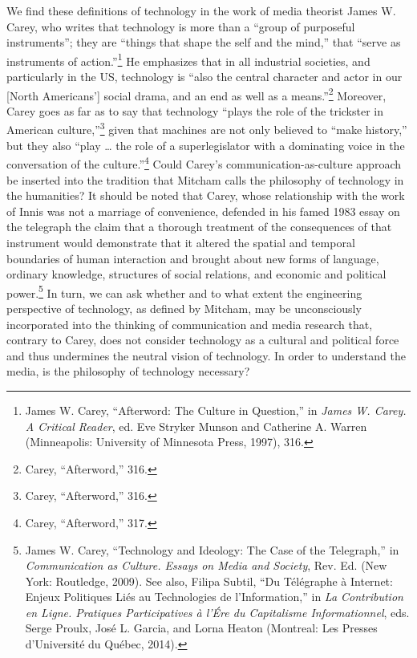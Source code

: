 \documentclass{tufte-handout}
\begin{document}
We find these definitions of technology in the work of media theorist
James W. Carey, who writes that technology is more than a ``group of
purposeful instruments''; they are ``things that shape the self and the
mind,'' that ``serve as instruments of
action.''\footnote{James W. Carey, ``Afterword: The Culture in Question,'' in \emph{James
  W. Carey. A Critical Reader}, ed. Eve Stryker Munson and Catherine A.
  Warren (Minneapolis: University of Minnesota Press, 1997), 316.
} He emphasizes that in
all industrial societies, and particularly in the US, technology is
``also the central character and actor in our {[}North Americans'{]}
social drama, and an end as well as a
means.''\footnote{Carey, ``Afterword,'' 316.
} Moreover, Carey goes as
far as to say that technology ``plays the role of the trickster in
American culture,''\footnote{Carey, ``Afterword,'' 316.
} given that
machines are not only believed to ``make history,'' but they also ``play
\ldots{} the role of a superlegislator with a dominating voice in the
conversation of the culture.''\footnote{Carey, ``Afterword,'' 317.
}
Could Carey's communication-as-culture approach be inserted into the
tradition that Mitcham calls the philosophy of technology in the
humanities? It should be noted that Carey, whose relationship with the
work of Innis was not a marriage of convenience, defended in his famed
1983 essay on the telegraph the claim that a thorough treatment of the
consequences of that instrument would demonstrate that it altered the
spatial and temporal boundaries of human interaction and brought about
new forms of language, ordinary knowledge, structures of social
relations, and economic and political
power.\footnote{James W. Carey, ``Technology and Ideology: The Case of the
  Telegraph,'' in \emph{Communication as Culture. Essays on Media and
  Society}, Rev. Ed. (New York: Routledge, 2009). See also, Filipa
  Subtil, ``Du Télégraphe à Internet: Enjeux Politiques Liés au
  Technologies de l'Information,'' in \emph{La Contribution en Ligne.
  Pratiques Participatives à l'Ére du Capitalisme Informationnel}, eds.
  Serge Proulx, José L. Garcia, and Lorna Heaton (Montreal: Les Presses
  d'Université du Québec, 2014).
} In turn, we can ask
whether and to what extent the engineering perspective of technology, as
defined by Mitcham, may be unconsciously incorporated into the thinking
of communication and media research that, contrary to Carey, does not
consider technology as a cultural and political force and thus
undermines the neutral vision of technology. In order to understand the
media, is the philosophy of technology necessary?
\end{document}
